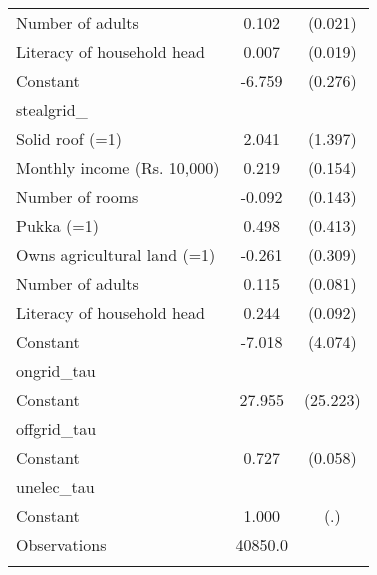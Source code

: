 \begin{table}[htbp]
{\begin{tabular}{l*{1}{cc}}
Number of adults    &       0.102\sym{***}&     (0.021)\\
Literacy of household head&       0.007         &     (0.019)\\
Constant            &      -6.759\sym{***}&     (0.276)\\
\midrule
stealgrid\_          &                     &            \\
Solid roof (=1)     &       2.041         &     (1.397)\\
Monthly income (Rs. 10,000)&       0.219         &     (0.154)\\
Number of rooms     &      -0.092         &     (0.143)\\
Pukka (=1)          &       0.498         &     (0.413)\\
Owns agricultural land (=1)&      -0.261         &     (0.309)\\
Number of adults    &       0.115         &     (0.081)\\
Literacy of household head&       0.244\sym{***}&     (0.092)\\
Constant            &      -7.018\sym{*}  &     (4.074)\\
\midrule
ongrid\_tau          &                     &            \\
Constant            &      27.955         &    (25.223)\\
\midrule
offgrid\_tau         &                     &            \\
Constant            &       0.727\sym{***}&     (0.058)\\
\midrule
unelec\_tau          &                     &            \\
Constant            &       1.000         &         (.)\\
\midrule
Observations        &     40850.0         &            \\
\bottomrule
\multicolumn{3}{l}{\footnotesize }\\
\end{tabular}}
\end{table}
